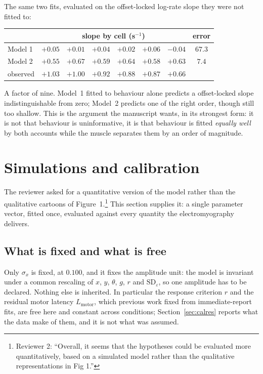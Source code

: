 \documentclass[a4paper,11pt]{article}
\newcommand{\RR}[1]{\textcolor{refcol}{#1}}
\newcommand{\NN}[1]{\textcolor{newcol}{#1}}
\newcommand{\refnote}[1]{\footnote{\textcolor{refcol}{\textsf{\footnotesize #1}}}}
\newcommand{\1}{\mathbbm{1}}
\newcommand{\Lmo}{L_{\mathrm{motor}}}
\begin{document}
The same two fits, evaluated on the offset-locked log-rate slope they were not fitted to:

\begin{center}
\begin{tabular}{lccccccc}
\toprule
& \multicolumn{6}{c}{slope by cell (s$^{-1}$)} & error\\
\midrule
Model 1 & $+0.05$ & $+0.01$ & $+0.04$ & $+0.02$ & $+0.06$ & $-0.04$ & $67.3$\\
Model 2 & $+0.55$ & $+0.67$ & $+0.59$ & $+0.64$ & $+0.58$ & $+0.63$ & $\mathbf{7.4}$\\
observed & $+1.03$ & $+1.00$ & $+0.92$ & $+0.88$ & $+0.87$ & $+0.66$ & \\
\bottomrule
\end{tabular}
\end{center}

A factor of nine. Model~1 fitted to behaviour alone predicts a offset-locked slope
indistinguishable from zero; Model~2 predicts one of the right order, though still too
shallow. This is the argument the manuscript wants, in its strongest form: it is not
that behaviour is uninformative, it is that behaviour is fitted \emph{equally well} by
both accounts while the muscle separates them by an order of magnitude.

\section{Simulations and calibration}
\label{sec:sim}

\RR{The reviewer asked for a quantitative version of the model rather than the
qualitative cartoons of Figure~1.}\refnote{Reviewer 2: ``Overall, it seems that the
hypotheses could be evaluated more quantitatively, based on a simulated model rather
than the qualitative representations in Fig 1.''} \RR{This section supplies it: a single
parameter vector, fitted once, evaluated against every quantity the electromyography
delivers.}

\subsection{What is fixed and what is free}

Only $\sigma_x$ is fixed, at $0.100$, and it fixes the amplitude unit: the model is
invariant under a common rescaling of $x$, $y$, $\theta$, $g$, $r$ and
$\mathrm{SD}_\varepsilon$, so one amplitude has to be declared. \NN{Nothing else is
inherited.} In particular the response criterion $r$ and the residual motor latency
$\Lmo$, which previous work fixed from immediate-report fits, are free here and
constant across conditions; Section~\ref{sec:calres} reports what the data make of
them, and it is not what was assumed.
\end{document}
